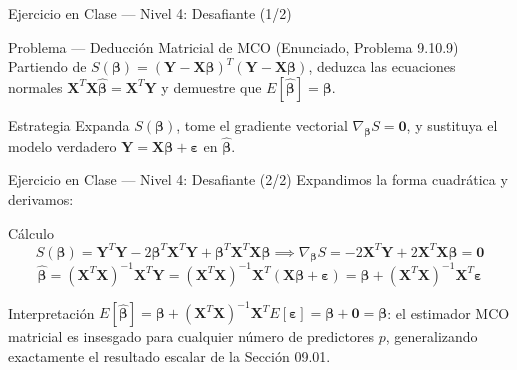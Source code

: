 \documentclass[10pt, aspectratio=169]{beamer}
\begin{document}
\begin{frame}{Ejercicio en Clase --- Nivel 4: Desafiante (1/2)}
  \footnotesize
  \begin{block}{Problema --- Deducción Matricial de MCO (Enunciado, Problema 9.10.9)}
    Partiendo de $S(\boldsymbol\beta)=(\mathbf{Y}-\mathbf{X}\boldsymbol\beta)^T(\mathbf{Y}-\mathbf{X}\boldsymbol\beta)$, deduzca las ecuaciones normales $\mathbf{X}^T\mathbf{X}\hat{\boldsymbol\beta}=\mathbf{X}^T\mathbf{Y}$ y demuestre que $E[\hat{\boldsymbol\beta}]=\boldsymbol\beta$.
  \end{block}

  \vspace{0.1cm}
  \pause
  \begin{alertblock}{Estrategia}
    \scriptsize
    Expanda $S(\boldsymbol\beta)$, tome el gradiente vectorial $\nabla_{\boldsymbol\beta}S=\mathbf{0}$, y sustituya el modelo verdadero $\mathbf{Y}=\mathbf{X}\boldsymbol\beta+\boldsymbol\varepsilon$ en $\hat{\boldsymbol\beta}$.
  \end{alertblock}
\end{frame}

\begin{frame}{Ejercicio en Clase --- Nivel 4: Desafiante (2/2)}
  \scriptsize
  Expandimos la forma cuadrática y derivamos: \pause

  \vspace{0.05cm}
  \begin{block}{Cálculo}
    \scriptsize
    $$S(\boldsymbol\beta)=\mathbf{Y}^T\mathbf{Y}-2\boldsymbol\beta^T\mathbf{X}^T\mathbf{Y}+\boldsymbol\beta^T\mathbf{X}^T\mathbf{X}\boldsymbol\beta \implies \nabla_{\boldsymbol\beta}S=-2\mathbf{X}^T\mathbf{Y}+2\mathbf{X}^T\mathbf{X}\boldsymbol\beta=\mathbf{0}$$
    $$\hat{\boldsymbol\beta}=(\mathbf{X}^T\mathbf{X})^{-1}\mathbf{X}^T\mathbf{Y}=(\mathbf{X}^T\mathbf{X})^{-1}\mathbf{X}^T(\mathbf{X}\boldsymbol\beta+\boldsymbol\varepsilon)=\boldsymbol\beta+(\mathbf{X}^T\mathbf{X})^{-1}\mathbf{X}^T\boldsymbol\varepsilon$$
  \end{block}

  \vspace{0.05cm}
  \pause
  \begin{alertblock}{Interpretación}
    $E[\hat{\boldsymbol\beta}]=\boldsymbol\beta+(\mathbf{X}^T\mathbf{X})^{-1}\mathbf{X}^T E[\boldsymbol\varepsilon]=\boldsymbol\beta+\mathbf{0}=\boldsymbol\beta$: el estimador MCO matricial es insesgado para cualquier número de predictores $p$, generalizando exactamente el resultado escalar de la Sección 09.01.
  \end{alertblock}
\end{frame}
\end{document}
